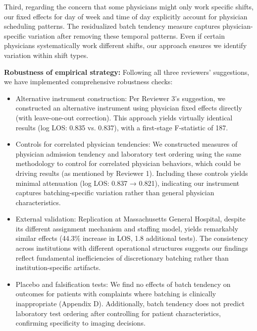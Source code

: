 \documentclass[11pt]{article}
\newcommand{\1}{\hbox{\rm 1\kern-.35em 1}}
\begin{document}
{Third, regarding the concern that some physicians might only work specific shifts, our fixed effects for day of week and time of day explicitly account for physician scheduling patterns. The residualized batch tendency measure captures physician-specific variation after removing these temporal patterns. Even if certain physicians systematically work different shifts, our approach ensures we identify variation within shift types.

\textbf{Robustness of empirical strategy:} Following all three reviewers' suggestions, we have implemented comprehensive robustness checks: 

\begin{itemize}
    \item Alternative instrument construction: Per Reviewer 3's suggestion, we constructed an alternative instrument using physician fixed effects directly (with leave-one-out correction). This approach yields virtually identical results (log LOS: 0.835 vs. 0.837), with a first-stage F-statistic of 187.

    \item Controls for correlated physician tendencies: We constructed measures of physician admission tendency and laboratory test ordering using the same methodology to control for correlated physician behaviors, which could be driving results (as mentioned by Reviewer 1). Including these controls yields minimal attenuation (log LOS: 0.837 → 0.821), indicating our instrument captures batching-specific variation rather than general physician characteristics.

    \item External validation: Replication at Massachusetts General Hospital, despite its different assignment mechanism and staffing model, yields remarkably similar effects (44.3\% increase in LOS, 1.8 additional tests). The consistency across institutions with different operational structures suggests our findings reflect fundamental inefficiencies of discretionary batching rather than institution-specific artifacts.


    \item Placebo and falsification tests: We find no effects of batch tendency on outcomes for patients with complaints where batching is clinically inappropriate (Appendix D). Additionally, batch tendency does not predict laboratory test ordering after controlling for patient characteristics, confirming specificity to imaging decisions.

\end{itemize}


}
\end{document}
